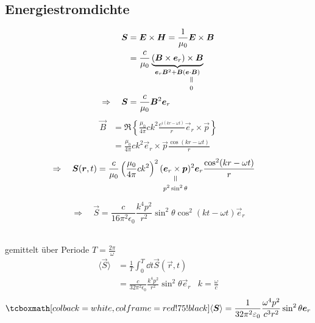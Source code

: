 \subsection{Energiestromdichte}

\begin{align*}
\vec{S} &= \vec{E} \times \vec{H} = \frac{1}{\mu_0} \vec{E} \times \vec{B}\\
&= \frac{c}{\mu_0} \ub{(\vec{B} \times \vec{e}_r) \times \vec{B}}_{\vec{e}_r \vec{B}^2 + \vec{B} (\equalto{\vec{e}\cdot \vec{B}}{0})}\\
\Rightarrow \quad \vec{S} &= \frac{c}{\mu_0} \vec{B}^2 \vec{e}_r
\end{align*}
\begin{align*}
\vec{B} &= \Re \left\{ \frac{\mu_0}{4 \pi} c k^2 \frac{e^{i(kr-\omega t)}}{r} \vec{e}_r \times \vec{p} \right\}\\
&= \frac{\mu_0}{4 \pi} ck^2 \vec{e}_r \times \vec{p} \frac{\cos(kr - \omega t)}{r}
\end{align*}
\begin{align*}
\Rightarrow \quad \vec{S}(\vec{r},t) &= \frac{c}{\mu_0} \left(\frac{\mu_0}{4 \pi} ck^2\right)^2 (\equalto{\vec{e}_r \times \vec{p}}{p^2 \sin^2 \theta} )^2 \vec{e}_r \frac{\cos^2(kr - \omega t)}{r}
\end{align*}
\begin{minipage}{.7\linewidth}
	\begin{equation*}
	\Rightarrow \quad \vec{S} = \frac{c}{16 \pi^2 \epsilon_0} \frac{k^4 p^2}{r^2} \sin^2 \theta \cos^2(k t - \omega t) \vec{e}_r
	\end{equation*}
\end{minipage}%
\begin{minipage}{.3\linewidth}
	\flushright
\end{minipage}%
\\
gemittelt über Periode $ T = \frac{2 \pi}{\omega} $
\begin{align*}
\langle \vec{S} \rangle &= \frac{1}{T} \int_{0}^{T} \dd t \vec{S}(\vec{r},t)\\
&= \frac{c}{32 \pi^2 \epsilon_0} \frac{k^4 p^2}{r^2} \sin^2 \theta \vec{e}_r & k = \frac{\omega}{c}
\end{align*}
\begin{equation*}
\rmbox{\langle \vec{S} \rangle = \frac{1}{32 \pi^2 \epsilon_0} \frac{\omega^4 p^2}{c^3 r^2} \sin^2 \theta \vec{e}_r}
\end{equation*}
